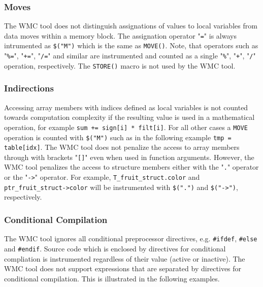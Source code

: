 \subsubsection{Moves}

The WMC tool does not distinguish assignations of values to local variables from data moves within a memory block. The assignation operator "\verb|=|" is always intrumented as \verb|$("M")| which is the same as \verb|MOVE()|. Note, that operators such as "\verb|%=|", "\verb|+=|", "\verb|/=|" and similar are instrumented and counted as a single "\verb|%|", "\verb|+|", "\verb|/|" operation, respectively. The \verb|STORE()| macro is not used by the WMC tool.

\subsubsection{Indirections}

Accessing array members with indices defined as local variables is not counted towards computation complexity if the resulting value is used in a mathematical operation, for example \verb|sum += sign[i] * filt[i]|. For all other cases a \verb|MOVE| operation is counted with \verb|$("M")| such as in the following example \verb|tmp = table[idx]|. The WMC tool does not penalize the access to array members through with brackets "\verb|[]|" even when used in function arguments. However, the WMC tool penalizes the access to structure members either with the "\verb|.|" operator or the "\verb|->|" operator. For example, \verb|T_fruit_struct.color| and \verb|ptr_fruit_struct->color| will be instrumented with \verb|$(".")| and \verb|$("->")|, respectively.

\subsubsection{Conditional Compilation}

The WMC tool ignores all conditional preprocessor directives, e.g. \verb|#ifdef|, \verb|#else| and \verb|#endif|. Source code which is enclosed by directives for conditional compliation is instrumented regardless of their value (active or inactive). The WMC tool does not support expressions that are separated by directives for conditional compilation. This is illustrated in the following examples.

